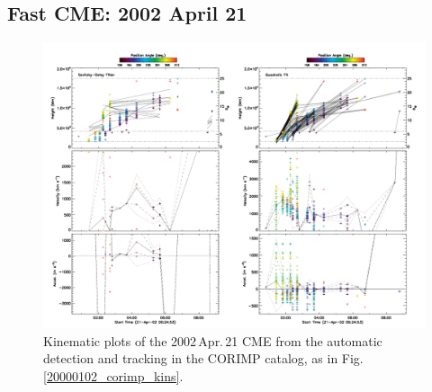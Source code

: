 \documentclass[referee,a4paper,12pt,traditabstract]{swsc}
\begin{document}
\begin{linenumbers}
\subsection{Fast CME: 2002 April 21}
\label{sect_20020421}


\begin{figure}[t]
\centerline{\includegraphics[width=\linewidth]{images/20020421_corimp_kins.pdf}}
\caption{Kinematic plots of the 2002\,Apr.\,21 CME from the automatic detection and tracking in the CORIMP catalog, as in Fig.\,\ref{20000102_corimp_kins}.}
\label{20020421_corimp_kins}
\end{figure}



\end{linenumbers}
\end{document}
